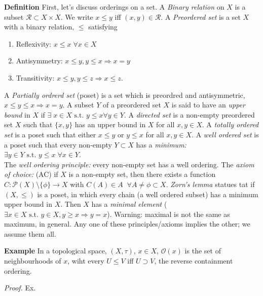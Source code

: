 \documentclass[12pt]{article}
\newcommand{\pset}[1]{ \mathcal{P}(#1) }
\newcommand{\st}[0]{ \textrm{ s.t. } }
\newcommand{\rimply}[0] { \Rightarrow }
\newcommand{\rarw}[0] { \rightarrow }
\newcommand{\curlyO}[0] { \mathcal{O} }
\newcommand{\R}[0] { \mathcal{R} }
\begin{document}
\begin{flushleft} 
  { \bf Definition } First, let's discuss orderings on a set. A \emph{Binary relation} on $X$ is a subset $\R \subset X \times X$. We write $x \le y$ iff $(x,y) \in \R$. A \emph{Preordered set} is a set $X$ with a binary relation, $\le$ satisfying\begin{enumerate}[i]
\item
  Reflexivity: $x \le x \; \forall x \in X$\
\item
  Antisymmetry: $x \le y, y \le x \rimply x=y$
\item
  Transitivity: $x \le y, y \le z \rimply x \le z$.
\end{enumerate}
A \emph{Partially ordrerd set} (poset) is a set which is preordred and antisymmetric, $x \le y \le x \rimply x=y$.
A subset $Y$ of a preordered set $X$ is said to have an \emph{upper bound} in $X$ if $\exists \; x \in X \st y \le x \forall y \in Y$.
A \emph{directed set} is a non-empty preordered set $X$ such that $\{x,y\}$ has an upper bound in $X$ for all $x,y \in X$.
A \emph{totally ordered set} is a poset such that either $x \le y$ or $y \le x$ for all $x,y \in X$.
A \emph{well ordered set} is a poset such that every non-empty $Y \subset X$ has a \emph{minimum:} $\exists y \in Y \st y \le x \; \forall x \in Y$. \\


The \emph{well ordering principle:} every non-empty set has a well ordering.
The \emph{axiom of choice:} (AC) if $X$ is a non-empty set, then there exists a function $C: \pset{X} \setminus \{ \phi \} \rarw X$ with $C(A) \in A \; \; \forall A \not = \phi \subset X$.
\emph{Zorn's lemma} statues tat if $(X, \le)$ is a poset, in which every chain (a well ordered subset) has a minimum upper bound in $X$. Then $X$ has a \emph{minimal element} ( $\exists x \in X \st  y \in X, y\ge x \rimply y=x$). Warning: maximal is not the same as maximum, in general. Any one of these principles/axioms implies the other; we assume them all.
\end{flushleft}


\begin{flushleft} {\bf Example} 
In a topological space, $(X, \tau)$, $x \in X$, $\curlyO(x)$ is the set of neighbourhoods of $x$, wiht every $U \le V$ iff $U \supset V$, the reverse containment ordering.
\end{flushleft}

\begin{flushleft}
\emph{Proof.} Ex.
\end{flushleft}
\end{document}
